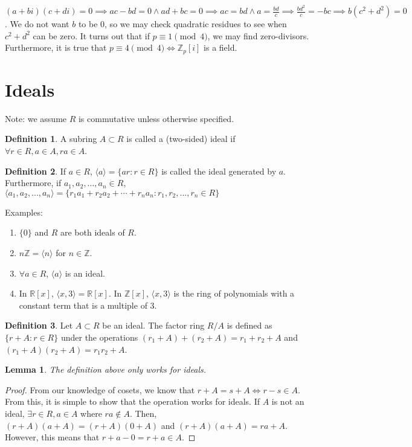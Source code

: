 \documentclass{article}
\theoremstyle{definition}
\newtheorem{definition}{Definition}
\theoremstyle{plain}
\theoremstyle{corollary}
\theoremstyle{lemma}
\newtheorem{lemma}{Lemma}
\begin{document}
$(a+bi)(c+di)=0\implies ac-bd=0\land ad+bc=0\implies ac=bd\land a=\frac{bd}c\implies\frac{bd^2}c=-bc\implies b(c^2+d^2)=0$. We do not want $b$ to be 0, so we may check quadratic residues to see when $c^2+d^2$ can be zero. It turns out that if $p\equiv1\pmod 4$, we may find zero-divisors. Furthermore, it is true that $p\equiv4\pmod4\iff\mathbb{Z}_p[i]$ is a field.

\section{Ideals}
Note: we assume $R$ is commutative unless otherwise specified.
\begin{definition}
    A subring $A\subset R$ is called a (two-sided) ideal if $\forall r\in R,a\in A,ra\in A$.
\end{definition}

\begin{definition}
    If $a\in R$, $\langle a\rangle=\{ar:r\in R\}$ is called the ideal generated by $a$. Furthermore, if $a_1,a_2,\dots,a_n\in R$, $\langle a_1,a_2,...,a_n\rangle=\{r_1a_1+r_2a_2+\cdots+r_na_n:r_1,r_2,...,r_n\in R\}$
\end{definition}

Examples:
\begin{enumerate}
    \item $\{0\}$ and $R$ are both ideals of $R$.
    \item $n\mathbb{Z}=\langle n\rangle$ for $n\in\mathbb{Z}$.
    \item $\forall a\in R$, $\langle a\rangle$ is an ideal.
    \item In $\mathbb{R}[x]$, $\langle x,3\rangle=\mathbb{R}[x]$. In $\mathbb{Z}[x]$, $\langle x,3\rangle$ is the ring of polynomials with a constant term that is a multiple of 3.
\end{enumerate}

\begin{definition}
    Let $A\subset R$ be an ideal. The factor ring $R/A$ is defined as $\{r+A:r\in R\}$ under the operations $(r_1+A)+(r_2+A)=r_1+r_2+A$ and $(r_1+A)(r_2+A)=r_1r_2+A$.
\end{definition}

\begin{lemma}
    The definition above only works for ideals.
\end{lemma}

\begin{proof}
    From our knowledge of cosets, we know that $r+A=s+A\iff r-s\in A$. From this, it is simple to show that the operation works for ideals. If $A$ is not an ideal, $\exists r\in R,a\in A$ where $ra\notin A$. Then, $(r+A)(a+A)=(r+A)(0+A)$ and $(r+A)(a+A)=ra+A$. However, this means that $r+a-0=r+a\in A$.
\end{proof}
\end{document}
